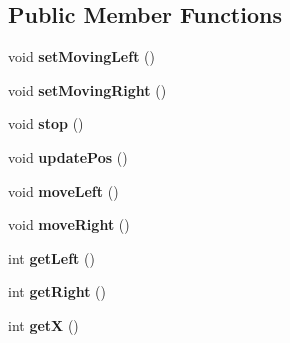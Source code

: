 \subsection*{Public Member Functions}
\begin{DoxyCompactItemize}
\item 
\hypertarget{classbrick_breaker_1_1_racket_a350fa11540f07d2eed108a1aa75240e2}{
void {\bfseries setMovingLeft} ()}
\label{classbrick_breaker_1_1_racket_a350fa11540f07d2eed108a1aa75240e2}

\item 
\hypertarget{classbrick_breaker_1_1_racket_ac2bdea9a9f15d06648f2c2094ff123ba}{
void {\bfseries setMovingRight} ()}
\label{classbrick_breaker_1_1_racket_ac2bdea9a9f15d06648f2c2094ff123ba}

\item 
\hypertarget{classbrick_breaker_1_1_racket_a1d5ee505bd935fa6b8ea6001c15a57b9}{
void {\bfseries stop} ()}
\label{classbrick_breaker_1_1_racket_a1d5ee505bd935fa6b8ea6001c15a57b9}

\item 
\hypertarget{classbrick_breaker_1_1_racket_ab439c6379d04064940f4a09007d5fe4c}{
void {\bfseries updatePos} ()}
\label{classbrick_breaker_1_1_racket_ab439c6379d04064940f4a09007d5fe4c}

\item 
\hypertarget{classbrick_breaker_1_1_racket_ab92ecb01070ce2fdefd99c3cc5212994}{
void {\bfseries moveLeft} ()}
\label{classbrick_breaker_1_1_racket_ab92ecb01070ce2fdefd99c3cc5212994}

\item 
\hypertarget{classbrick_breaker_1_1_racket_a755ac54ffa2ff2013442cda726fcf268}{
void {\bfseries moveRight} ()}
\label{classbrick_breaker_1_1_racket_a755ac54ffa2ff2013442cda726fcf268}

\item 
\hypertarget{classbrick_breaker_1_1_racket_a8d29bc2897ed97686e2be3e96308629b}{
int {\bfseries getLeft} ()}
\label{classbrick_breaker_1_1_racket_a8d29bc2897ed97686e2be3e96308629b}

\item 
\hypertarget{classbrick_breaker_1_1_racket_ad947f4853fbe782ab81e5a90e87ec360}{
int {\bfseries getRight} ()}
\label{classbrick_breaker_1_1_racket_ad947f4853fbe782ab81e5a90e87ec360}

\item 
\hypertarget{classbrick_breaker_1_1_racket_ac70c03dfe6eff9485e79e1430a0a2ab0}{
int {\bfseries getX} ()}
\label{classbrick_breaker_1_1_racket_ac70c03dfe6eff9485e79e1430a0a2ab0}


\end{DoxyCompactItemize}
